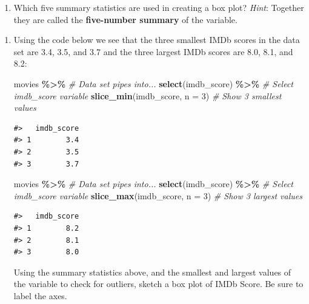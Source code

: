 \documentclass[
]{report}
\newenvironment{Shaded}{\begin{snugshade}}{\end{snugshade}}
\newcommand{\CommentTok}[1]{\textcolor[rgb]{0.56,0.35,0.01}{\textit{#1}}}
\newcommand{\DataTypeTok}[1]{\textcolor[rgb]{0.13,0.29,0.53}{#1}}
\newcommand{\DecValTok}[1]{\textcolor[rgb]{0.00,0.00,0.81}{#1}}
\newcommand{\KeywordTok}[1]{\textcolor[rgb]{0.13,0.29,0.53}{\textbf{#1}}}
\newcommand{\NormalTok}[1]{#1}
\newcommand{\OperatorTok}[1]{\textcolor[rgb]{0.81,0.36,0.00}{\textbf{#1}}}
\newcommand{\StringTok}[1]{\textcolor[rgb]{0.31,0.60,0.02}{#1}}
\providecommand{\tightlist}{%
  \setlength{\itemsep}{0pt}\setlength{\parskip}{0pt}}
\begin{document}
\begin{enumerate}
\def\labelenumi{\arabic{enumi}.}
\setcounter{enumi}{10}
\tightlist
\item
  Which five summary statistics are used in creating a box plot? \emph{Hint}: Together they are called the \textbf{five-number summary} of the variable.
\end{enumerate}

\vspace{0.4in}

\begin{enumerate}
\def\labelenumi{\arabic{enumi}.}
\setcounter{enumi}{11}
\item
  Using the code below we see that the three smallest IMDb scores in the data set are 3.4, 3.5, and 3.7 and the three largest IMDb scores are 8.0, 8.1, and 8.2:

\begin{Shaded}
\begin{Highlighting}[]
\NormalTok{movies }\OperatorTok{\%\textgreater{}\%}\StringTok{ }\CommentTok{\# Data set pipes into...}
\StringTok{  }\KeywordTok{select}\NormalTok{(imdb\_score) }\OperatorTok{\%\textgreater{}\%}\StringTok{ }\CommentTok{\# Select imdb\_score variable}
\StringTok{  }\KeywordTok{slice\_min}\NormalTok{(imdb\_score, }\DataTypeTok{n =} \DecValTok{3}\NormalTok{)  }\CommentTok{\# Show 3 smallest values}
\end{Highlighting}
\end{Shaded}

\begin{verbatim}
#>   imdb_score
#> 1        3.4
#> 2        3.5
#> 3        3.7
\end{verbatim}

\begin{Shaded}
\begin{Highlighting}[]
\NormalTok{movies }\OperatorTok{\%\textgreater{}\%}\StringTok{ }\CommentTok{\# Data set pipes into...}
\StringTok{  }\KeywordTok{select}\NormalTok{(imdb\_score) }\OperatorTok{\%\textgreater{}\%}\StringTok{ }\CommentTok{\# Select imdb\_score variable}
\StringTok{  }\KeywordTok{slice\_max}\NormalTok{(imdb\_score, }\DataTypeTok{n =} \DecValTok{3}\NormalTok{)  }\CommentTok{\# Show 3 largest values}
\end{Highlighting}
\end{Shaded}

\begin{verbatim}
#>   imdb_score
#> 1        8.2
#> 2        8.1
#> 3        8.0
\end{verbatim}

  Using the summary statistics above, and the smallest and largest values of the variable to check for outliers, sketch a box plot of IMDb Score. Be sure to label the axes.
\end{enumerate}
\end{document}

